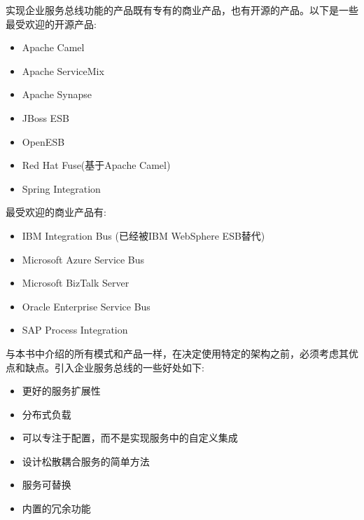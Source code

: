 实现企业服务总线功能的产品既有专有的商业产品，也有开源的产品。以下是一些最受欢迎的开源产品:

\begin{itemize}
\item 
Apache Camel

\item 
Apache ServiceMix

\item 
Apache Synapse

\item 
JBoss ESB

\item 
OpenESB

\item 
Red Hat Fuse(基于Apache Camel)

\item 
Spring Integration
\end{itemize}

最受欢迎的商业产品有:

\begin{itemize}
\item 
IBM Integration Bus (已经被IBM WebSphere ESB替代)

\item 
Microsoft Azure Service Bus

\item 
Microsoft BizTalk Server

\item 
Oracle Enterprise Service Bus

\item 
SAP Process Integration
\end{itemize}

与本书中介绍的所有模式和产品一样，在决定使用特定的架构之前，必须考虑其优点和缺点。引入企业服务总线的一些好处如下:

\begin{itemize}
\item 
更好的服务扩展性

\item 
分布式负载

\item 
可以专注于配置，而不是实现服务中的自定义集成

\item 
设计松散耦合服务的简单方法

\item 
服务可替换

\item 
内置的冗余功能
\end{itemize}

